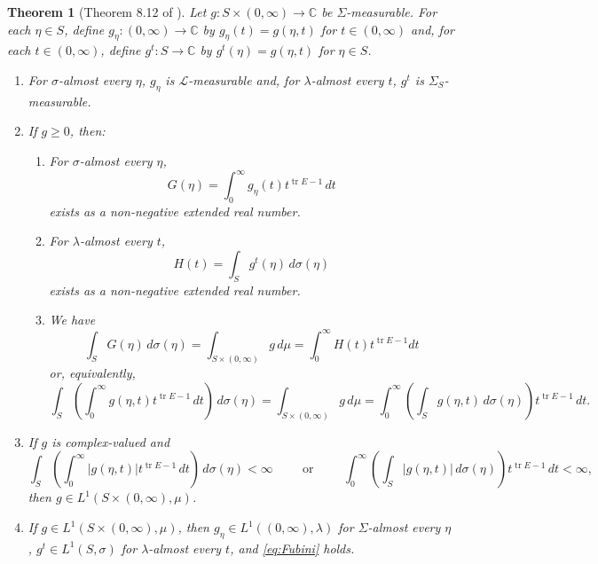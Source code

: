 \documentclass[11pt]{article}
\theoremstyle{theorem}
\newtheorem{theorem}{Theorem}[section]
\newcommand\tr{\operatorname{tr}}
\begin{document}
\begin{theorem}[Theorem 8.12 of \cite{Rudin1987}]\label{thm:Fubini}
Let $g:S\times (0,\infty)\to\mathbb{C}$ be $\Sigma$-measurable. For each $\eta\in S$, define $g_\eta:(0,\infty)\to\mathbb{C}$ by $g_\eta(t)=g(\eta,t)$ for $t\in (0,\infty)$ and, for each $t\in (0,\infty)$, define $g^t:S\to\mathbb{C}$ by $g^t(\eta)=g(\eta,t)$ for $\eta\in S$. 
\begin{enumerate}
\item For $\sigma$-almost every $\eta$, $g_\eta$ is $\mathcal{L}$-measurable and, for $\lambda$-almost every $t$, $g^t$ is $\Sigma_S$-measurable.
\item\label{item:Fubini1} If $g\geq 0$, then:
\begin{enumerate}
\item For $\sigma$-almost every $\eta$,
\begin{equation*}
G(\eta)=\int_0^\infty g_\eta(t)t^{\tr E-1}\,dt
\end{equation*}
exists as a non-negative extended real number. 
\item For $\lambda$-almost every $t$, 
\begin{equation*}
H(t)=\int_S g^t(\eta)\,d\sigma(\eta)
\end{equation*}
exists as a non-negative extended real number. 
\item We have
\begin{equation*}
\int_S G(\eta)\,d\sigma(\eta)=\int_{S\times (0,\infty)}g\,d\mu=\int_0^\infty H(t)t^{\tr E-1}dt
\end{equation*}
or, equivalently,
\begin{equation}\label{eq:Fubini}
\int_S\left(\int_0^\infty g(\eta,t)t^{\tr E-1}\,dt\right)\,d\sigma(\eta)=\int_{S\times(0,\infty)}g\,d\mu=\int_0^\infty\left(\int_S g(\eta,t)\,d\sigma(\eta)\right)t^{\tr E-1}\,dt.
\end{equation}
\end{enumerate}
\item\label{item:Fubini2} If $g$ is complex-valued and
\begin{equation*}
\int_S\left(\int_0^\infty |g(\eta,t)|t^{\tr E-1}\,dt\right)\,d\sigma(\eta)<\infty\hspace{1cm}\mbox{or}\hspace{1cm}\int_0^\infty\left(\int_S|g(\eta,t)|\,d\sigma(\eta)\right)t^{\tr E-1}\,dt<\infty,
\end{equation*}
then $g\in L^1(S\times (0,\infty),\mu)$.
\item If $g\in L^1(S\times (0,\infty),\mu)$, then $g_\eta\in L^1((0,\infty),\lambda)$ for $\Sigma$-almost every $\eta$, $g^t\in L^1(S,\sigma)$ for $\lambda$-almost every $t$, and \eqref{eq:Fubini} holds.
\end{enumerate}
\end{theorem}
\end{document}
